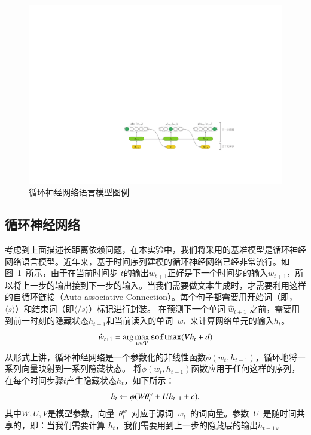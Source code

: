 \begin{figure}[!b]
  \centering
  \includegraphics[width=.99\columnwidth]{./figures/lm.pdf}
  \caption{循环神经网络语言模型图例}
  \label{fig:lm}
\end{figure}

\subsection{循环神经网络}
考虑到上面描述长距离依赖问题，在本实验中，我们将采用的基准模型是循环神经网络语言模型。近年来，基于时间序列建模的循环神经网络已经非常流行。如图~\ref{fig:lm}~所示，由于在当前时间步 $t$的输出$w_{t+1}$正好是下一个时间步的输入$w_{t+1}$，所以将上一步的输出接到下一步的输入。当我们需要做文本生成时，才需要利用这样的自循环链接（Auto-associative Connection）。每个句子都需要用开始词（即，$\langle s\rangle$）和结束词（即$\langle / s\rangle$）标记进行封装。 在预测下一个单词 $\hat w_{t+1}$ 之前，需要用到前一时刻的隐藏状态$h_{t-1}$和当前读入的单词~$w_t$~来计算网络单元的输入$h_t$。
\begin{equation}
\setlength{\abovedisplayskip}{6pt}
\setlength{\belowdisplayskip}{6pt}
  \hat w_{t+1}=\arg\max_{w\in\mathcal{V}} \mathtt{softmax}(Vh_t+d)
\end{equation}
从形式上讲，循环神经网络是一个参数化的非线性函数$\phi(w_t,h_{t-1})$，循环地将一系列向量映射到一系列隐藏状态。 将$\phi(w_t,h_{t-1})$函数应用于任何这样的序列，在每个时间步骤$t$产生隐藏状态$h_t$，如下所示：
\begin{equation}
\setlength{\abovedisplayskip}{6pt}
\setlength{\belowdisplayskip}{6pt}
  h_t \leftarrow  \phi(W\theta^w_t + U h_{t-1} +c),
\end{equation}
其中$ W,U,V $是模型参数，向量~$\theta^w_t$~对应于源词~$w_t$~的词向量。参数~$U$~是随时间共享的，即：当我们需要计算 $h_t$，我们需要用到上一步的隐藏层的输出$h_{t-1}$。

